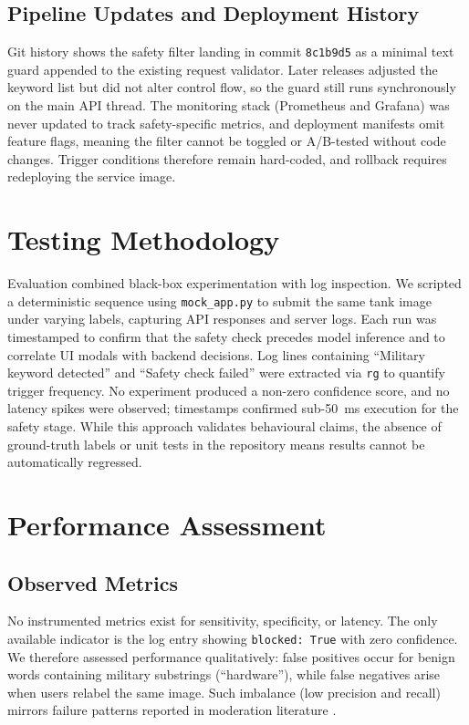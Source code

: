 \documentclass[conference]{IEEEtran}
\begin{document}
\subsection{Pipeline Updates and Deployment History}
Git history shows the safety filter landing in commit \texttt{8c1b9d5} as a minimal text guard appended to the existing request validator. Later releases adjusted the keyword list but did not alter control flow, so the guard still runs synchronously on the main API thread. The monitoring stack (Prometheus and Grafana) was never updated to track safety-specific metrics, and deployment manifests omit feature flags, meaning the filter cannot be toggled or A/B-tested without code changes. Trigger conditions therefore remain hard-coded, and rollback requires redeploying the service image.

\section{Testing Methodology}
Evaluation combined black-box experimentation with log inspection. We scripted a deterministic sequence using \texttt{mock\_app.py} to submit the same tank image under varying labels, capturing API responses and server logs. Each run was timestamped to confirm that the safety check precedes model inference and to correlate UI modals with backend decisions. Log lines containing ``Military keyword detected'' and ``Safety check failed'' were extracted via \texttt{rg} to quantify trigger frequency. No experiment produced a non-zero confidence score, and no latency spikes were observed; timestamps confirmed sub-50~ms execution for the safety stage. While this approach validates behavioural claims, the absence of ground-truth labels or unit tests in the repository means results cannot be automatically regressed.

\section{Performance Assessment}
\subsection{Observed Metrics}
No instrumented metrics exist for sensitivity, specificity, or latency. The only available indicator is the log entry showing \texttt{blocked: True} with zero confidence. We therefore assessed performance qualitatively: false positives occur for benign words containing military substrings (``hardware''), while false negatives arise when users relabel the same image. Such imbalance (low precision and recall) mirrors failure patterns reported in moderation literature \cite{toncheva2025types, gongane2022detection}.
\end{document}

